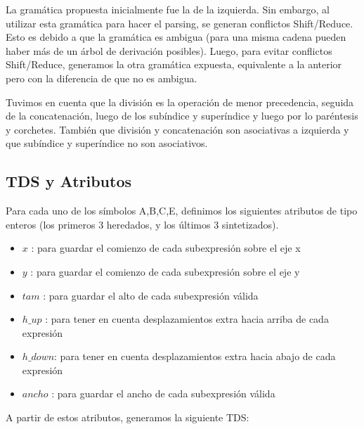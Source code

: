 \documentclass[a4paper, 10pt, twoside]{article}
\begin{document}
La gramática propuesta inicialmente fue la de la izquierda. Sin embargo, al utilizar esta gramática para hacer el parsing, se generan conflictos Shift/Reduce. Esto es debido a que la gramática es ambigua (para una misma cadena pueden haber más de un árbol de derivación posibles). Luego, para evitar conflictos Shift/Reduce, generamos la otra gramática expuesta, equivalente a la anterior pero con la diferencia de que no es ambigua.

Tuvimos en cuenta que la división es la operación de menor precedencia, seguida de la concatenación, luego de los subíndice y superíndice y luego por lo paréntesis y corchetes. También que división y concatenación son asociativas a izquierda y que subíndice y superíndice no son asociativos.

\subsection{TDS y Atributos}
Para cada uno de los símbolos A,B,C,E, definimos los siguientes atributos de tipo enteros (los primeros 3 heredados, y los últimos 3 sintetizados).
\begin{itemize}
  \item $x$ : para guardar el comienzo de cada subexpresión sobre el eje x
  \item $y$ : para guardar el comienzo de cada subexpresión sobre el eje y
  \item $tam$ : para guardar el alto de cada subexpresión válida
  \item $h\_up$ : para tener en cuenta desplazamientos extra hacia arriba de cada expresión
  \item $h\_down$: para tener en cuenta desplazamientos extra hacia abajo de cada expresión
  \item $ancho$ : para guardar el ancho de cada subexpresión válida
\end{itemize}

A partir de estos atributos, generamos la siguiente TDS:
\end{document}
